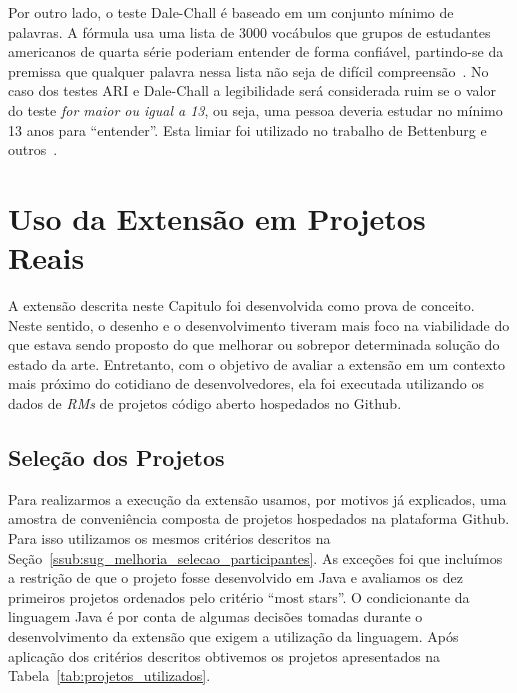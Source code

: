 Por outro lado, o teste Dale-Chall é baseado em um conjunto mínimo de palavras.
A fórmula usa uma lista de 3000 vocábulos que grupos de estudantes americanos de
quarta série poderiam entender de forma confiável, partindo-se da premissa que
qualquer palavra nessa lista não seja de difícil
compreensão~\cite{dale1948formula}. No caso dos testes ARI e Dale-Chall a
legibilidade será considerada ruim se o valor do teste \textit{for maior ou
    igual a 13}, ou seja, uma pessoa deveria estudar no mínimo 13 anos para
``entender''. Esta limiar foi utilizado no trabalho de Bettenburg e
outros~\cite{bettenburg2008makes}.

\section{Uso da Extensão em Projetos Reais}
\label{sec:avaliando_a_extensao_proposta}

A extensão descrita neste Capitulo foi desenvolvida como prova de conceito.
Neste sentido, o desenho e o desenvolvimento tiveram mais foco na viabilidade do
que estava sendo proposto do que melhorar ou sobrepor determinada solução do
estado da arte. Entretanto, com o objetivo de avaliar a extensão em um contexto
mais próximo do cotidiano de desenvolvedores, ela foi executada utilizando os
dados de \textit{RMs} de projetos código aberto hospedados no Github.

\subsection{Seleção dos Projetos}
\label{sub:implementacao_selecao_projetos}

Para realizarmos a execução da extensão usamos, por motivos já explicados, uma
amostra de conveniência composta de projetos hospedados na plataforma Github.
Para isso utilizamos os mesmos critérios descritos na
Seção~\ref{ssub:sug_melhoria_selecao_participantes}. As exceções foi que
incluímos a restrição de que o projeto fosse desenvolvido em Java e avaliamos os
dez primeiros projetos ordenados pelo critério ``most stars''. O condicionante
da linguagem Java é por conta de algumas decisões tomadas durante o
desenvolvimento da extensão que exigem a utilização da linguagem. Após aplicação
dos critérios descritos obtivemos os projetos apresentados na
Tabela~\ref{tab:projetos_utilizados}.

\begin{table}[htpb]
\centering
{}
\caption{Projetos utilizados no testes de execução da extensão. Os dados
    apresentados têm como referência 23/04/2017.}
\label{tab:projetos_utilizados}
\end{table}

